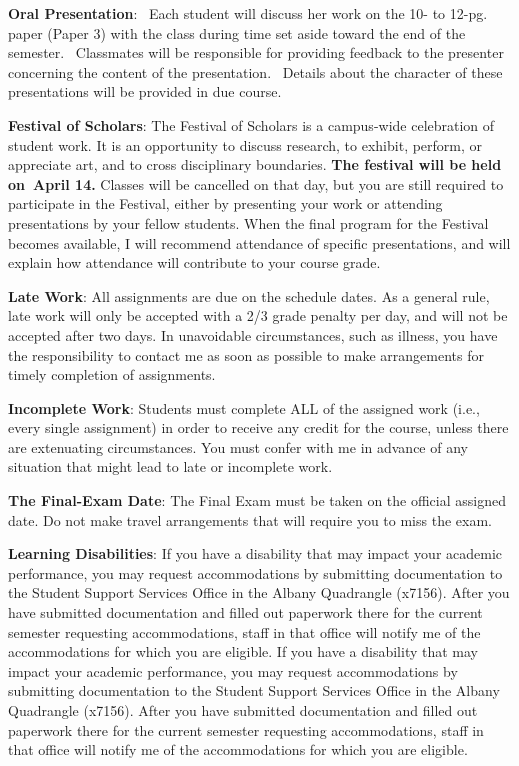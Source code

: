 \documentclass[10pt,preprint]{aastex}
\begin{document}
\textbf{Oral Presentation}:  Each student will discuss her work on the 10- to 12-pg. paper (Paper 3) with the class during time set aside toward the end of the semester.  Classmates will be responsible for providing feedback to the presenter concerning the content of the presentation.  Details about the character of these presentations will be provided in due course.

\textbf{Festival of Scholars}:  The Festival of Scholars is a campus-wide celebration of student work. It is an opportunity to discuss research, to exhibit, perform, or appreciate art, and to cross disciplinary boundaries. \textbf{The festival will be held on April 14.} Classes will be cancelled on that day, but you are still required to participate in the Festival, either by presenting your work or attending presentations by your fellow students. When the final program for the Festival becomes available, I will recommend attendance of specific presentations, and will explain how attendance will contribute to your course grade.

\textbf{Late Work}:  All assignments are due on the schedule dates. As a general rule, late work will only be accepted with a 2/3 grade penalty per day, and will not be accepted after two days. In unavoidable circumstances, such as illness, you have the responsibility to contact me as soon as possible to make arrangements for timely completion of assignments.  

\textbf{Incomplete Work}: Students must complete ALL of the assigned work (i.e., every single assignment) in order to receive any credit for the course, unless there are extenuating circumstances.  You must confer with me in advance of any situation that might lead to late or incomplete work.

\textbf{The Final-Exam Date}: The Final Exam must be taken on the official assigned date.  Do not make travel arrangements that will require you to miss the exam.

\textbf{Learning Disabilities}: If you have a disability that may impact your academic performance, you may request accommodations by submitting documentation to the Student Support Services Office in the Albany Quadrangle (x7156).  After you have submitted documentation and filled out paperwork there for the current semester requesting accommodations, staff in that office will notify me of the accommodations for which you are eligible. If you have a disability that may impact your academic performance, you may request accommodations by submitting documentation to the Student Support Services Office in the Albany Quadrangle (x7156).  After you have submitted documentation and filled out paperwork there for the current semester requesting accommodations, staff in that office will notify me of the accommodations for which you are eligible.
\end{document}
